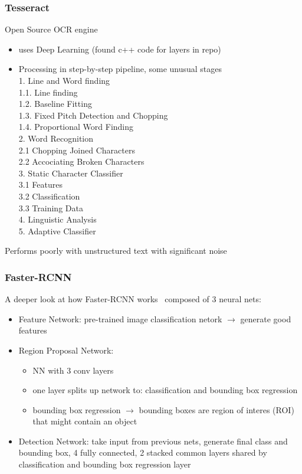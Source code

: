 \subsubsection*{Tesseract}
Open Source OCR engine~\cite{smith_overview_2007}
\begin{itemize}
    \item uses Deep Learning (found c++ code for layers in repo)
    \item Processing in step-by-step pipeline, some unusual stages\\
        1. Line and Word finding\\
        1.1. Line finding\\
        1.2. Baseline Fitting\\
        1.3. Fixed Pitch Detection and Chopping\\
        1.4. Proportional Word Finding\\
        2. Word Recognition\\
        2.1 Chopping Joined Characters\\
        2.2 Accociating Broken Characters\\
        3. Static Character Classifier\\
        3.1 Features\\
        3.2 Classification\\
        3.3 Training Data\\
        4. Linguistic Analysis\\
        5. Adaptive Classifier
\end{itemize}
Performs poorly with unstructured text with significant noise

\subsubsection*{Faster-RCNN}
A deeper look at how Faster-RCNN works~\cite{goswami_deeper_2018}
composed of 3 neural nets:
\begin{itemize}
    \item Feature Network: pre-trained image classification netork $\rightarrow$ generate good features
    \item Region Proposal Network:
        \begin{itemize}
            \item NN with 3 conv layers
            \item one layer splits up network to: classification and bounding box regression
            \item bounding box regression $\rightarrow$ bounding boxes are region of interes (ROI)
                that might contain an object
        \end{itemize}
    \item Detection Network: take input from previous nets, generate final class and bounding box,
        4 fully connected, 2 stacked common layers shared by classification and bounding box regression
        layer
\end{itemize}

